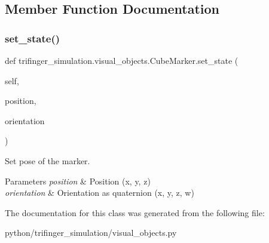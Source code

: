 \subsection{Member Function Documentation}
\mbox{\label{classtrifinger__simulation_1_1visual__objects_1_1CubeMarker_a76e7dc46d15bc36fa10ec09f18cb2f26}} 
\subsubsection{\texorpdfstring{set\+\_\+state()}{set\_state()}}
{\footnotesize\ttfamily def trifinger\+\_\+simulation.\+visual\+\_\+objects.\+Cube\+Marker.\+set\+\_\+state (\begin{DoxyParamCaption}\item[{}]{self,  }\item[{}]{position,  }\item[{}]{orientation }\end{DoxyParamCaption})}



Set pose of the marker. 


\begin{DoxyParams}{Parameters}
{\em position} & Position (x, y, z) \\
\hline
{\em orientation} & Orientation as quaternion (x, y, z, w) \\
\hline
\end{DoxyParams}


The documentation for this class was generated from the following file\+:\begin{DoxyCompactItemize}
\item 
python/trifinger\+\_\+simulation/visual\+\_\+objects.\+py\end{DoxyCompactItemize}
